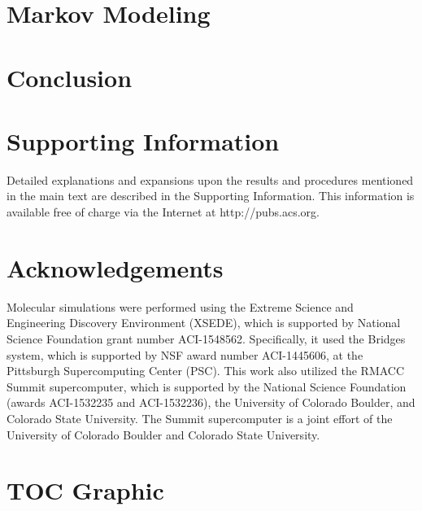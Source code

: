 \documentclass{article}
\begin{document}
  \section{Markov Modeling}\label{section:markov_models}

  \section{Conclusion}
 
  \section*{Supporting Information}

  Detailed explanations and expansions upon the results and procedures mentioned in
  the main text are described in the Supporting Information. This information is
  available free of charge via the Internet at http://pubs.acs.org.

  \section*{Acknowledgements}

  Molecular simulations were performed using the Extreme Science and
  Engineering Discovery Environment (XSEDE), which is supported by National
  Science Foundation grant number ACI-1548562. Specifically, it used the Bridges
  system, which is supported by NSF award number ACI-1445606, at the Pittsburgh
  Supercomputing Center (PSC). This work also utilized the RMACC Summit supercomputer,
  which is supported by the National Science Foundation (awards ACI-1532235 and
  ACI-1532236), the University of Colorado Boulder, and Colorado State
  University. The Summit supercomputer is a joint effort of the University of
  Colorado Boulder and Colorado State University.

  \clearpage

  
  

  \newpage

  \section*{TOC Graphic}
\end{document}
